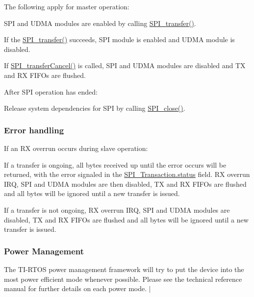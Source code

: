 The following apply for master operation\-:
\begin{DoxyItemize}
\item S\-P\-I and U\-D\-M\-A modules are enabled by calling \hyperlink{_s_p_i_8h_a989e17f96b54fcc3dc2cac5f8ac6bdb2}{S\-P\-I\-\_\-transfer()}.
\item If the \hyperlink{_s_p_i_8h_a989e17f96b54fcc3dc2cac5f8ac6bdb2}{S\-P\-I\-\_\-transfer()} succeeds, S\-P\-I module is enabled and U\-D\-M\-A module is disabled.
\item If \hyperlink{_s_p_i_8h_a6819f7761fc3505c4f885653ff8121f0}{S\-P\-I\-\_\-transfer\-Cancel()} is called, S\-P\-I and U\-D\-M\-A modules are disabled and T\-X and R\-X F\-I\-F\-Os are flushed.
\end{DoxyItemize}After S\-P\-I operation has ended\-:
\begin{DoxyItemize}
\item Release system dependencies for S\-P\-I by calling \hyperlink{_s_p_i_8h_a0e3448b30b88609fa120915e49560601}{S\-P\-I\-\_\-close()}.
\end{DoxyItemize}

\subsubsection*{Error handling}

If an R\-X overrun occurs during slave operation\-:
\begin{DoxyItemize}
\item If a transfer is ongoing, all bytes received up until the error occurs will be returned, with the error signaled in the \hyperlink{struct_s_p_i___transaction_aa244504b2384411f7de17340be62128a}{S\-P\-I\-\_\-\-Transaction.\-status} field. R\-X overrun I\-R\-Q, S\-P\-I and U\-D\-M\-A modules are then disabled, T\-X and R\-X F\-I\-F\-Os are flushed and all bytes will be ignored until a new transfer is issued.
\item If a transfer is not ongoing, R\-X overrun I\-R\-Q, S\-P\-I and U\-D\-M\-A modules are disabled, T\-X and R\-X F\-I\-F\-Os are flushed and all bytes will be ignored until a new transfer is issued.
\end{DoxyItemize}

\subsubsection*{Power Management}

The T\-I-\/\-R\-T\-O\-S power management framework will try to put the device into the most power efficient mode whenever possible. Please see the technical reference manual for further details on each power mode. $|$

